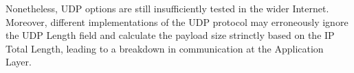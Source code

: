 Nonetheless, UDP options are still insufficiently tested in the wider Internet.
Moreover, different implementations of the UDP protocol may erroneously ignore
the UDP Length field and calculate the payload size strinctly based on the
IP Total Length, leading to a breakdown in communication at the Application
Layer.

